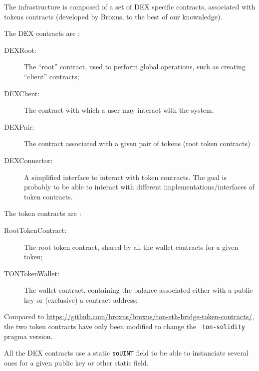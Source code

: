 
The infrastructure is composed of a set of DEX specific contracts,
associated with tokens contracts (developed by Broxus, to the best of
our knownledge).

The DEX contracts are :

\begin{description}
\item[DEXRoot:] The ``root'' contract, used to perform global
  operations, such as creating ``client'' contracts;
\item[DEXClient:] The contract with which a user may interact with the
  system.
\item[DEXPair:] The contract associated with a given pair of tokens
  (root token contracts)
\item[DEXConnector:] A simplified interface to interact with token
  contracts. The goal is probably to be able to interact with
  different implementations/interfaces of token contracts.
\end{description}

The token contracts are :

\begin{description}
\item[RootTokenContract:] The root token contract, shared by all the
  wallet contracts for a given token;
\item[TONTokenWallet:] The wallet contract, containing the balance
  associated either with a public key or (exclusive) a contract
  address;
\end{description}

Compared to
\url{https://github.com/broxus/broxus/ton-eth-bridge-token-contracts/},
the two token contracts have only been modified to change the {\tt
  ton-solidity} pragma version.

All the DEX contracts use a static {\tt soUINT} field to be able to
instanciate several ones for a given public key or other static field.
